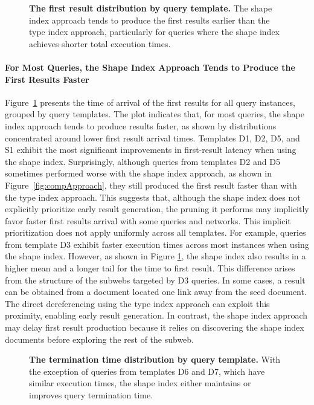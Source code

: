 \begin{figure}
    \centering
    
    \caption{
    \textbf{The first result distribution by query template.}    
    The shape index approach tends to produce the first results earlier than the type index approach, particularly for queries where the shape index achieves shorter total execution times.}
    \label{fig:first_res}
\end{figure}

\paragraph{For Most Queries, the Shape Index Approach Tends to Produce the First Results Faster}
Figure~\ref{fig:first_res} presents the time of arrival of the first results for all query instances, grouped by query templates. 
The plot indicates that, for most queries, the shape index approach tends to produce results faster, as shown by distributions concentrated around lower first result arrival times.
Templates D1, D2, D5, and S1 exhibit the most significant improvements in first-result latency when using the shape index.
Surprisingly, although queries from templates D2 and D5 sometimes performed worse with the shape index approach, as shown in Figure~\ref{fig:compApproach}, they still produced the first result faster than with the type index approach.
This suggests that, although the shape index does not explicitly prioritize early result generation, the pruning it performs may implicitly favor faster first results arrival with some queries and networks. 
This implicit prioritization does not apply uniformly across all templates. 
For example, queries from template D3 exhibit faster execution times across most instances when using the shape index.
However, as shown in Figure \ref{fig:first_res}, the shape index also results in a higher mean and a longer tail for the time to first result.
This difference arises from the structure of the subwebs targeted by D3 queries.
In some cases, a result can be obtained from a document located one link away from the seed document.
The direct dereferencing using the type index approach can exploit this proximity, enabling early result generation.
In contrast, the shape index approach may delay first result production because it relies on discovering the shape index documents before exploring the rest of the subweb.

\begin{figure}
    \centering
    
    \caption{
     \textbf{The termination time distribution by query template.}    
    With the exception of queries from templates D6 and D7, which have similar execution times, the shape index either maintains or improves query termination time.}
    \label{fig:termination_time}
\end{figure}

